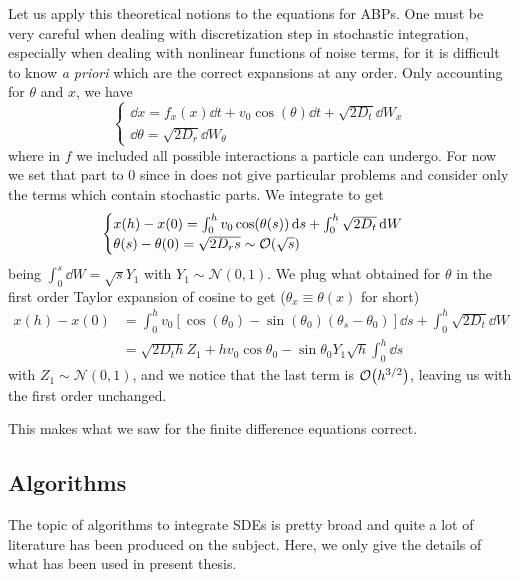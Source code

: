 \documentclass[../../master_thesis_np.tex]{subfiles}
\begin{document}
		Let us apply this theoretical notions to the equations for ABPs. One must be very careful when dealing with discretization step in stochastic integration, especially when dealing with nonlinear functions of noise terms, for it is difficult to know \emph{a priori} which are the correct expansions at any order. Only accounting for $\theta$ and $x$, we have
		\begin{equation} 
			\begin{cases}
			\dd{x} = f_x(x)\dd{t} + v_0\cos(\theta)\dd{t} + \sqrt{2D_t}\dd{W_x} \\
			\dd{\theta} = \sqrt{2D_r}\dd{W_\theta}
			\end{cases} 
		\end{equation} 
		where in $f$ we included all possible interactions a particle can undergo. For now we set that part to 0 since in does not give particular problems and consider only the terms which contain stochastic parts. We integrate to get
		\begin{equation}
			\begin{cases}
				x(h) - x(0) =  \int_{0}^{h}v_0 \cos(\theta(s)) \dd{s} + \int_{0}^{h} \sqrt{2D_t}\dd{W} \\
			\theta(s) - \theta(0) = \sqrt{2D_r s} \sim \order{\sqrt{s}}
		    \end{cases}  
	    \end{equation}
		being $\int_{0}^{s}\dd{W} = \sqrt{s} Y_1$ with $Y_1 \sim \mathcal{N}(0,1)$. We plug what obtained for $\theta$ in the first order Taylor expansion of cosine to get ($\theta_x \equiv \theta(x)$ for short)
		\begin{align} 
			x(h) - x(0) &=  \int_{0}^{h}v_0 \left[\cos(\theta_0) - \sin(\theta_0)(\theta_s-\theta_0)\right]\dd{s} + \int_{0}^{h} \sqrt{2D_t}\dd{W}  \\
			& = \sqrt{2D_th} Z_1 + hv_0 \cos\theta_0 - \sin \theta_0 Y_1 \sqrt{h} \int_{0}^{h}\dd{s}
	    \end{align}
	    with $Z_1 \sim \mathcal{N}(0,1)$, and we notice that the last term is $\order{h^{3/2}}$, leaving us with the first order unchanged.
	    
	    This makes what we saw for the finite difference equations correct.
	    
		\subsection{Algorithms}
		The topic of algorithms to integrate SDEs is pretty broad and quite a lot of literature has been produced on the subject. Here, we only give the details of what has been used in present thesis.
		
\end{document}
